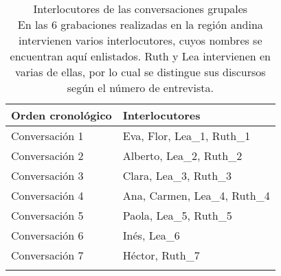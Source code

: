 \documentclass[output=paper]{../langscibook}
\begin{document}
\begin{table}
\caption{\label{tab:mick:9} Interlocutores de las conversaciones grupales\\En las 6 grabaciones realizadas en la región andina intervienen varios interlocutores, cuyos nombres se encuentran aquí enlistados. Ruth y Lea intervienen en varias de ellas, por lo cual se distingue sus discursos según el número de entrevista.}
\begin{tabularx}{\textwidth}{Xl}
\lsptoprule
\textbf{Orden} \textbf{cronológico} & \textbf{Interlocutores}\\
\midrule
Conversación 1 & Eva, Flor, Lea\_1, Ruth\_1\\
Conversación 2 & Alberto, Lea\_2, Ruth\_2\\
Conversación 3 & Clara, Lea\_3, Ruth\_3\\
Conversación 4 & Ana, Carmen, Lea\_4, Ruth\_4\\
Conversación 5 & Paola, Lea\_5, Ruth\_5\\
Conversación 6 & Inés, Lea\_6\\
Conversación 7 & Héctor, Ruth\_7\\
\lspbottomrule
\end{tabularx}
\end{table}
\end{document}
